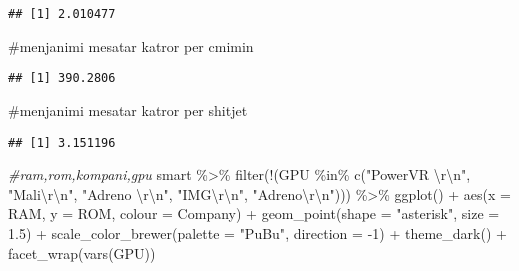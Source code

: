 \documentclass[
]{article}
\newenvironment{Shaded}{\begin{snugshade}}{\end{snugshade}}
\newcommand{\AttributeTok}[1]{\textcolor[rgb]{0.77,0.63,0.00}{#1}}
\newcommand{\CommentTok}[1]{\textcolor[rgb]{0.56,0.35,0.01}{\textit{#1}}}
\newcommand{\DecValTok}[1]{\textcolor[rgb]{0.00,0.00,0.81}{#1}}
\newcommand{\FloatTok}[1]{\textcolor[rgb]{0.00,0.00,0.81}{#1}}
\newcommand{\FunctionTok}[1]{\textcolor[rgb]{0.00,0.00,0.00}{#1}}
\newcommand{\NormalTok}[1]{#1}
\newcommand{\SpecialCharTok}[1]{\textcolor[rgb]{0.00,0.00,0.00}{#1}}
\newcommand{\StringTok}[1]{\textcolor[rgb]{0.31,0.60,0.02}{#1}}
\begin{document}
\begin{verbatim}
## [1] 2.010477
\end{verbatim}

\#menjanimi mesatar katror per cmimin

\begin{Shaded}
\end{Shaded}

\begin{verbatim}
## [1] 390.2806
\end{verbatim}

\#menjanimi mesatar katror per shitjet

\begin{Shaded}
\end{Shaded}

\begin{verbatim}
## [1] 3.151196
\end{verbatim}

\begin{Shaded}
\begin{Highlighting}[]
\CommentTok{\#ram,rom,kompani,gpu}
\NormalTok{smart }\SpecialCharTok{\%\textgreater{}\%}
 \FunctionTok{filter}\NormalTok{(}\SpecialCharTok{!}\NormalTok{(GPU }\SpecialCharTok{\%in\%} \FunctionTok{c}\NormalTok{(}\StringTok{"PowerVR }\SpecialCharTok{\textbackslash{}r\textbackslash{}n}\StringTok{"}\NormalTok{, }\StringTok{"Mali}\SpecialCharTok{\textbackslash{}r\textbackslash{}n}\StringTok{"}\NormalTok{, }\StringTok{"Adreno }\SpecialCharTok{\textbackslash{}r\textbackslash{}n}\StringTok{"}\NormalTok{, }\StringTok{"IMG}\SpecialCharTok{\textbackslash{}r\textbackslash{}n}\StringTok{"}\NormalTok{, }\StringTok{"Adreno}\SpecialCharTok{\textbackslash{}r\textbackslash{}n}\StringTok{"}\NormalTok{))) }\SpecialCharTok{\%\textgreater{}\%}
 \FunctionTok{ggplot}\NormalTok{() }\SpecialCharTok{+}
  \FunctionTok{aes}\NormalTok{(}\AttributeTok{x =}\NormalTok{ RAM, }\AttributeTok{y =}\NormalTok{ ROM, }\AttributeTok{colour =}\NormalTok{ Company) }\SpecialCharTok{+}
  \FunctionTok{geom\_point}\NormalTok{(}\AttributeTok{shape =} \StringTok{"asterisk"}\NormalTok{, }\AttributeTok{size =} \FloatTok{1.5}\NormalTok{) }\SpecialCharTok{+}
  \FunctionTok{scale\_color\_brewer}\NormalTok{(}\AttributeTok{palette =} \StringTok{"PuBu"}\NormalTok{, }\AttributeTok{direction =} \SpecialCharTok{{-}}\DecValTok{1}\NormalTok{) }\SpecialCharTok{+}
  \FunctionTok{theme\_dark}\NormalTok{() }\SpecialCharTok{+}
  \FunctionTok{facet\_wrap}\NormalTok{(}\FunctionTok{vars}\NormalTok{(GPU))}
\end{Highlighting}
\end{Shaded}
\end{document}
